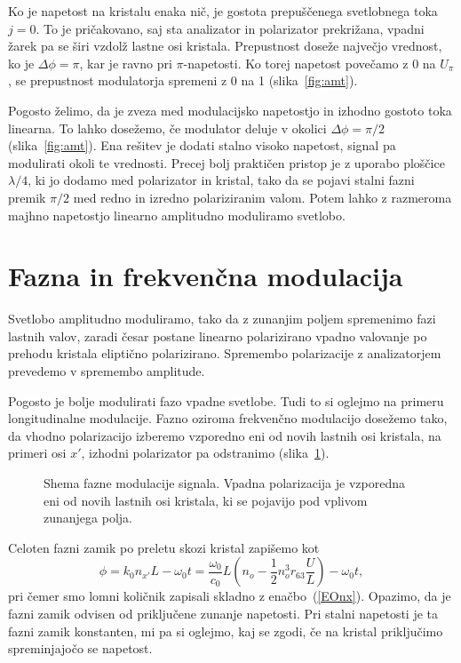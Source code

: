 Ko je napetost na kristalu enaka nič, je gostota prepuščenega svetlobnega toka 
$j=0$. To je pričakovano, saj sta analizator in polarizator prekrižana, 
vpadni žarek pa se širi vzdolž lastne osi kristala.
Prepustnost doseže največjo vrednost, ko je $\Delta \phi=\pi$, kar je ravno pri 
$\pi$-napetosti. Ko torej napetost povečamo z 0 na $U_\pi$, se
prepustnost modulatorja spremeni z 0 na 1 (slika~\ref{fig:amt}).

Pogosto želimo, da je zveza med modulacijsko napetostjo in izhodno
gostoto toka linearna. To lahko dosežemo, če modulator deluje v okolici $\Delta\phi=\pi/2$
(slika~\ref{fig:amt}).
Ena rešitev je dodati stalno visoko napetost, signal pa modulirati okoli
te vrednosti. Precej bolj praktičen pristop je z uporabo ploščice $\lambda/4$,
ki jo dodamo med polarizator in kristal, tako da se pojavi stalni
fazni premik $\pi/2$ med redno in izredno polariziranim valom. Potem lahko z razmeroma majhno napetostjo
linearno amplitudno moduliramo svetlobo.

\section{Fazna in frekvenčna modulacija}
Svetlobo amplitudno moduliramo, tako da z zunanjim
poljem spremenimo fazi lastnih valov, zaradi česar postane linearno
polarizirano vpadno valovanje po prehodu kristala eliptično polarizirano.
Spremembo polarizacije z analizatorjem prevedemo v spremembo amplitude.

Pogosto je bolje modulirati fazo vpadne svetlobe. Tudi to si oglejmo na primeru longitudinalne
 modulacije. Fazno oziroma 
 frekvenčno modulacijo dosežemo tako,
da vhodno polarizacijo izberemo vzporedno eni od novih lastnih osi kristala, 
na primeri osi $x'$, izhodni polarizator pa odstranimo (slika~\ref{fig:fmshema}). 
\begin{figure}[h]
\centering
\def\svgwidth{80truemm} 

\caption{Shema fazne modulacije signala. Vpadna polarizacija je vzporedna eni od 
novih lastnih osi kristala, ki se pojavijo pod vplivom zunanjega polja.}
\label{fig:fmshema}
\end{figure}

Celoten fazni zamik po preletu skozi kristal zapišemo kot 
\begin{equation}
\phi =  k_0 n_{x'} L -\omega_0 t= \frac{\omega_0}{c_0}L \left(n_o -
\frac{1}{2}n_o^3 r_{63}\frac{U}{L}\right)-\omega_0 t,
\label{fmphi}
\end{equation}
pri čemer smo lomni količnik zapisali skladno z enačbo~(\ref{EOnx}). Opazimo,
da je fazni zamik odvisen od priključene zunanje napetosti. Pri stalni napetosti je 
ta fazni zamik konstanten, mi pa si oglejmo, kaj se zgodi, če na kristal priključimo
spreminjajočo se napetost.

